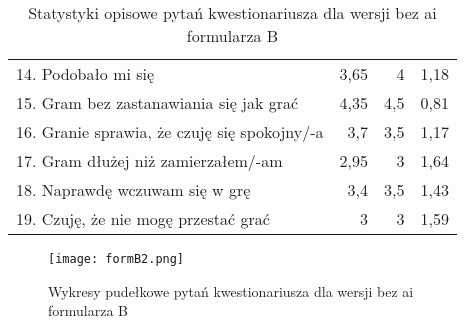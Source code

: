 \begin{table}[h!]
\begin{center}
\begin{tabular}{|m{10em}|r|r|r|}
            14. Podobało mi się                                               & 3,65          & 4       & 1,18           \\
            15. Gram bez zastanawiania się jak grać                           & 4,35          & 4,5     & 0,81           \\
            16. Granie sprawia, \newline że czuję się spokojny/-a             & 3,7           & 3,5     & 1,17           \\
            17. Gram dłużej \newline niż zamierzałem/-am                      & 2,95          & 3       & 1,64           \\
            18. Naprawdę wczuwam się w grę                                    & 3,4           & 3,5     & 1,43           \\
            19. Czuję, że nie mogę przestać grać                              & 3             & 3       & 1,59           \\
            \hline
        \end{tabular}
    \end{center}
    \caption{Statystyki opisowe pytań kwestionariusza dla wersji bez \gls{ai} formularza B}\label{tab1:appendixB_9}
\end{table}

\begin{figure}[h!]
    \centering
    \texttt{[image: formB2.png]}
    \caption{Wykresy pudełkowe pytań kwestionariusza dla wersji bez \gls{ai} formularza B}
    \label{fig:ch7_formB2}
\end{figure}